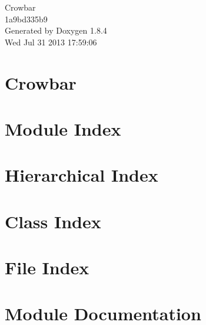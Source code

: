 \documentclass[twoside]{book}
\newcommand{\clearemptydoublepage}{%
  \newpage{\pagestyle{empty}\cleardoublepage}%
}
\begin{document}
\hypersetup{pageanchor=false}
\begin{titlepage}
\vspace*{7cm}
\begin{center}%
{\Large Crowbar \\[1ex]\large 1a9bd335b9 }\\
\vspace*{1cm}
{\large Generated by Doxygen 1.8.4}\\
\vspace*{0.5cm}
{\small Wed Jul 31 2013 17:59:06}\\
\end{center}
\end{titlepage}
\clearemptydoublepage
\tableofcontents
\clearemptydoublepage
{}
\hypersetup{pageanchor=true}

\chapter{Crowbar}
\label{md_README}
\hypertarget{md_README}{}

\chapter{Module Index}

\chapter{Hierarchical Index}

\chapter{Class Index}

\chapter{File Index}

\chapter{Module Documentation}


\end{document}
